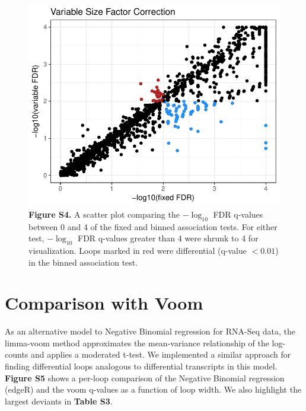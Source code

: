 \documentclass{article}\usepackage[]{graphicx}\usepackage[]{color}
\makeatletter
\def\maxwidth{ %
  \ifdim\Gin@nat@width>\linewidth
    \linewidth
  \else
    \Gin@nat@width
  \fi
}
\newenvironment{knitrout}{}{} %
\makeatother
\begin{document}
\begin{figure}[h]
\begin{knitrout}
\color{fgcolor}

{\centering \includegraphics[width=\maxwidth]{figure/closeMDF-1} 

}



\end{knitrout}
\centering
\caption{\textbf{Figure S4.} A scatter plot comparing the $-\log_{10}$ FDR q-values between 0 and 4 of the fixed and binned association tests. For either test, $-\log_{10}$ FDR q-values greater than 4 were shrunk to 4 for visualization. Loops marked in red were differential (q-value $<0.01$) in the binned association test.} 
\end{figure}  \clearpage


\section*{Comparison with Voom}
As an alternative model to Negative Binomial regression for RNA-Seq data, the limma-voom method approximates the mean-variance relationship of the log-counts and applies a moderated t-test. We implemented a similar approach for finding differential loops analogous to differential transcripts in this model. \textbf{Figure S5} shows a per-loop comparison of the Negative Binomial regression (edgeR) and the voom q-values as a function of loop width. We also highlight the largest deviants in \textbf{Table S3}. 
\end{document}
